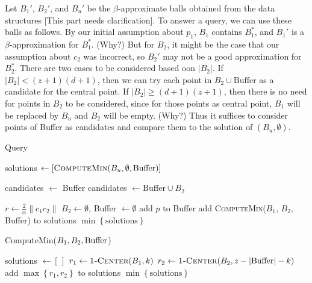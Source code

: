 \documentclass[envcountsame]{cls/cccg15}
\newcommand{\rc}{r}
\newcommand{\dz}{(d + 1)(z + 1)}
\newcommand{\Call}[2]{\textsc{#1}(#2)}
\newcommand{\set}[1]{\left\{ #1 \right\}}
\newcommand{\card}[1]{\left|{#1}\right|}
\newcommand{\len}[1]{\|{#1}\|}
\newcommand{\gee}{\geqslant}
\renewcommand{\ge}{\gee}
\begin{document}
Let $B_1'$, $B_2'$, and $B_u'$ be the $\beta$-approximate balls obtained from the data structures
[This part needs clarification].
To answer a query, we can use these balls as follows. 
By our initial assumption about $p_1$, $B_1$ contains $B_1^*$,
and $B_1'$ is a $\beta$-approximation for $B_1^*$. (Why?)
But for $B_2$, it might be the case that our assumption about $c_2$ 
was incorrect, so $B_2'$ may not be a good approximation for $B_2^*$. 
There are two cases to be considered based oon $\card{B_2}$. 
If $\card{B_2} < (z+1)(d+1)$, then we can try each point in 
$B_2 \cup \mbox{Buffer}$ as a candidate for the central point. 
If $\card{B_2} \ge \dz$, then there is no need for points in $B_2$ to be considered, 
since for those points as central point, $B_1$ will be replaced by $B_u$ and $B_2$ will be empty. (Why?)
Thus it suffices to consider points of Buffer as candidates 
and compare them to the solution of $(B_u, \emptyset)$.


\begin{algorithm}
\caption{\sc Query} 
\label{alg:query}
\begin{algorithmic}[1]
	\STATE solutions $\gets [\Call{ComputeMin}{B_u, \emptyset, \text{Buffer}}]$
	
	\STATE candidates $\gets$ Buffer
	\IF {$\card{B_2} < \dz$}
		\STATE candidates $\gets \text{Buffer} \cup B_2$ %
	\ENDIF

		\STATE $\rc  \gets \frac{2}{\alpha} \len{c_1 c_2}$
		\STATE $B_2 \gets \emptyset$, Buffer $\gets \emptyset$ 
			\IF{\NOT \Call{AddToB$_2$}{$p$}}
				\STATE add $p$ to Buffer
			\ENDIF
		\ENDFOR
		\STATE add \Call{ComputeMin}{$B_1$, $B_2$, Buffer} to solutions
	\ENDFOR
	\RETURN $\min\set{\text{solutions}}$
\end{algorithmic}
\end{algorithm}

\begin{algorithm}
\caption{\sc ComputeMin($B_1, B_2, \text{\rm Buffer}$)} 
\label{alg:query}
\begin{algorithmic}[1]
	\STATE solutions $\gets [\,]$
	\FOR{$k \gets 0, \dots,(z - \card{\mbox{Buffer}})$}
		\STATE $r_1 \gets \Call{1-Center}{B_1, k}$
		\STATE $r_2 \gets \Call{1-Center}{B_2, z - \card{\mbox{Buffer}} - k}$
		\STATE add $\max \set{r_1, r_2}$ to solutions
	\ENDFOR
	\RETURN $\min\set{\text{solutions}}$
\end{algorithmic}
\end{algorithm}
\end{document}
